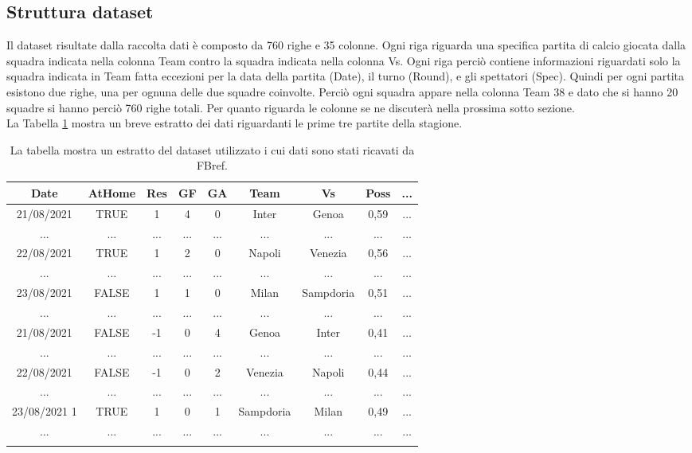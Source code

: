 \subsection{Struttura dataset}
Il dataset risultate dalla raccolta dati è composto da 760 righe e 35 colonne. Ogni riga riguarda una specifica partita di calcio giocata dalla squadra indicata nella colonna \textsf{Team} contro la squadra indicata nella colonna \textsf{Vs}. Ogni riga perciò contiene informazioni riguardati solo la squadra indicata in \textsf{Team} fatta eccezioni per la data della partita (\textsf{Date}), il turno (\textsf{Round}), e gli spettatori (\textsf{Spec}). Quindi per ogni partita esistono due righe, una per ognuna delle due squadre coinvolte. Perciò ogni squadra appare nella colonna \textsf{Team} 38 e dato che si hanno 20 squadre si hanno perciò 760 righe totali. Per quanto riguarda le colonne se ne discuterà nella prossima sotto sezione. \\
La Tabella \ref{tab:db} mostra un breve estratto dei dati riguardanti le prime tre partite della stagione. 
	\begin{table}[!ht]%

	\renewcommand{\arraystretch}{1.7}
	\centering
	\begin{tabular}{c c c c c c c c c  }
		\hline	

		\textbf{Date} & \textbf{AtHome} & \textbf{Res} & \textbf{GF} & \textbf{GA} & \textbf{Team} & \textbf{Vs} & \textbf{Poss} & \textbf{...}   \\	
		\hline	
		21/08/2021 & TRUE & 1 & 4 & 0 & Inter & Genoa & 0,59 & ... \\
		... & ... & ... & ... & ... & ... & ... & ... & ... \\
		22/08/2021  & TRUE & 1 & 2 & 0 & Napoli & Venezia & 0,56 & ... \\
		... & ... & ... & ... & ... & ... & ... & ... & ...  \\
		23/08/2021  & FALSE & 1 & 1 & 0 & Milan & Sampdoria & 0,51 & ... \\		
		... & ... & ... & ... & ... & ... & ... & ... & ... \\
		21/08/2021  & FALSE & -1 & 0 & 4 & Genoa & Inter & 0,41 & ... \\
		... & ... & ... & ... & ... & ... & ... & ... & ...  \\
		22/08/2021  & FALSE & -1 & 0 & 2 & Venezia & Napoli & 0,44 & ... \\
		... & ... & ... & ... & ... & ... & ... & ... & ...  \\
		23/08/2021 1 & TRUE & 1 & 0 & 1 & Sampdoria & Milan & 0,49 & ... \\
		... & ... & ... & ... & ... & ... & ... & ... & ...  \\
		\hline
		& & & & & & & & \\
		
		
		
	\end{tabular} \hbox{}
	
	\caption{La tabella mostra un estratto del dataset utilizzato i cui dati sono stati ricavati da FBref.} \label{tab:db}
\end{table}


